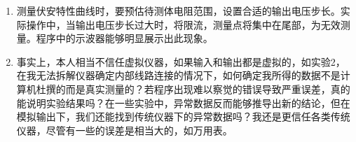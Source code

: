 \documentclass[UTF8]{article}
\begin{document}
\begin{enumerate}
\begin{enumerate}
        \item 测量伏安特性曲线时，要预估待测体电阻范围，设置合适的输出电压步长。实际操作中，当输出电压步长过大时，将限流，测量点将集中在尾部，为无效测量。程序中的示波器能够明显展示出此现象。
        \item 事实上，本人相当不信任虚拟仪器，如果输入和输出都是虚拟的，如实验2，在我无法拆解仪器确定内部线路连接的情况下，如何确定我所得的数据不是计算机杜撰的而是真实测量的？若程序出现难以察觉的错误导致严重误差，真的能说明实验结果吗？在一些实验中，异常数据反而能够推导出新的结论，但在模拟输出下，我们还能找到传统仪器下的异常数据吗？我还是更信任各类传统仪器，尽管有一些的误差是相当大的，如万用表。
    \end{enumerate}
\end{enumerate}
\end{document}
